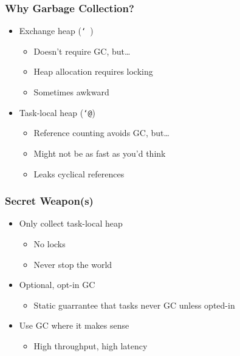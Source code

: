 \documentclass[ignorenonframetext,12pt]{beamer}
\begin{document}
\begin{frame}\frametitle{Why Garbage Collection?}
\begin{itemize}
  \item Exchange heap (\texttt{\char`~})
  \begin{itemize}
    \item Doesn't require GC, but\ldots
    \item Heap allocation requires locking
    \item Sometimes awkward
  \end{itemize}
  \item Task-local heap (\texttt{\char`@})
  \begin{itemize}
    \item Reference counting avoids GC, but\ldots
    \item Might not be as fast as you'd think
    \item Leaks cyclical references
  \end{itemize}
\end{itemize}
\end{frame}

\begin{frame}\frametitle{Secret Weapon(s)}
\begin{itemize}
  \item Only collect task-local heap
  \begin{itemize}
    \item No locks
    \item Never stop the world
  \end{itemize}
  \item Optional, opt-in GC
  \begin{itemize}
    \item Static guarrantee that tasks never GC unless opted-in
  \end{itemize}
  \item Use GC where it makes sense
  \begin{itemize}
    \item High throughput, high latency
  \end{itemize}
\end{itemize}
\end{frame}
\end{document}
